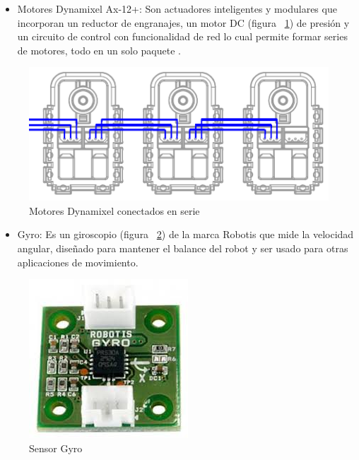 \begin{itemize}

\item Motores Dynamixel Ax-12+: Son actuadores inteligentes y modulares que incorporan un reductor de engranajes, un motor DC  (figura ~\ref{fig:motoresDc}) de presión y un circuito de control con funcionalidad de red lo cual permite formar series de motores, todo en un solo paquete \cite{manual}. 
\end{itemize}

\begin{figure}[hbtp]

\centering
\includegraphics[scale=0.5]{imagenes/AX-12_serie.png}
\caption{Motores Dynamixel conectados en serie}
\label{fig:motoresDc}
\end{figure}

\begin{itemize}
\item Gyro: Es un giroscopio (figura ~\ref{fig:gyro}) de la marca Robotis que mide la velocidad angular, diseñado para mantener el balance del robot y ser usado para otras aplicaciones de movimiento. \cite{gyro} 

\end{itemize}

\begin{figure}[hbtp]
\centering

\includegraphics[scale=0.3]{imagenes/gyro.jpg}

\caption{Sensor Gyro}
\label{fig:gyro}
\end{figure}

